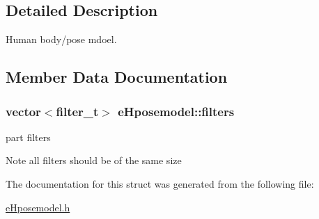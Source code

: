 \subsection{Detailed Description}
Human body/pose mdoel. 

\subsection{Member Data Documentation}
\hypertarget{structeHposemodel_a689384423c5273b949ac93f0b2906016}{
\subsubsection[{filters}]{\setlength{\rightskip}{0pt plus 5cm}vector$<${\bf filter\-\_\-t}$>$ e\-Hposemodel\-::filters}}\label{structeHposemodel_a689384423c5273b949ac93f0b2906016}


part filters 

\begin{DoxyNote}{Note}
all filters should be of the same size 
\end{DoxyNote}


The documentation for this struct was generated from the following file\-:\begin{DoxyCompactItemize}
\item 
\hyperlink{eHposemodel_8h}{e\-Hposemodel.\-h}\end{DoxyCompactItemize}
